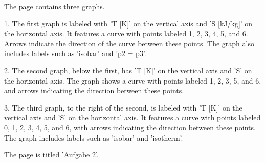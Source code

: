 The page contains three graphs. 

1. The first graph is labeled with 'T [K]' on the vertical axis and 'S [kJ/kg]' on the horizontal axis. It features a curve with points labeled 1, 2, 3, 4, 5, and 6. Arrows indicate the direction of the curve between these points. The graph also includes labels such as 'isobar' and 'p2 = p3'.

2. The second graph, below the first, has 'T [K]' on the vertical axis and 'S' on the horizontal axis. The graph shows a curve with points labeled 1, 2, 3, 5, and 6, and arrows indicating the direction between these points.

3. The third graph, to the right of the second, is labeled with 'T [K]' on the vertical axis and 'S' on the horizontal axis. It features a curve with points labeled 0, 1, 2, 3, 4, 5, and 6, with arrows indicating the direction between these points. The graph includes labels such as 'isobar' and 'isotherm'. 

The page is titled 'Aufgabe 2'.